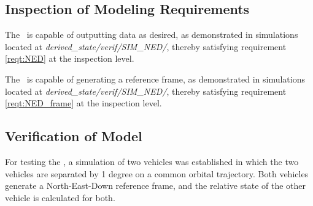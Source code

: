 %
%
% 
%


\subsection{Inspection of Modeling Requirements}


\label{inspect:NED}
 The \NEDDesc\ is capable of outputting data as desired, as demonstrated in simulations located at \textit{derived\_state/verif/SIM\_NED/}, thereby satisfying
 requirement \ref{reqt:NED} at the inspection level.

\label{inspect:NED_frame}
 The \NEDDesc\ is capable of generating a reference frame, as demonstrated in simulations located at \textit{derived\_state/verif/SIM\_NED/}, thereby satisfying
 requirement \ref{reqt:NED_frame} at the inspection level.


\subsection{Verification of Model}

 For testing the \NEDDesc, a simulation of two vehicles was established in which the two vehicles are separated by 1 degree on a common orbital trajectory. Both vehicles generate a North-East-Down reference frame, and the relative state of the other vehicle is calculated for both.

\label{test:NED}

